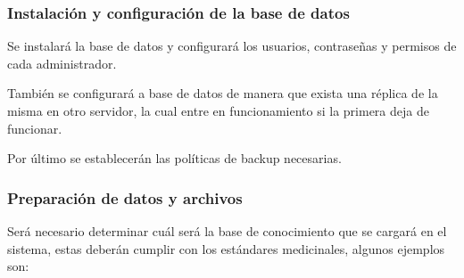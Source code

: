 \subsubsection{Instalación y configuración de la base de datos}
	Se instalará la base de datos y configurará los usuarios, contraseñas y permisos de cada administrador.
	
	También se configurará a base de datos de manera que exista una réplica de la  misma en otro servidor, la cual entre en funcionamiento si la primera deja de funcionar.
	
	Por último se establecerán las políticas de backup necesarias.


	\subsubsection{Preparación de datos y archivos}
	Será necesario determinar cuál será la base de conocimiento que se cargará en el sistema, estas deberán cumplir con los estándares medicinales, algunos ejemplos son:
